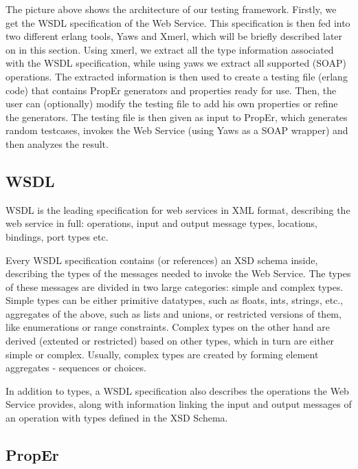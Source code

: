 \documentclass[submission,copyright,a4]{eptcs}
\begin{document}
The picture above shows the architecture of our testing framework. Firstly, we get the WSDL specification of the Web Service. This specification is then fed into two different erlang tools, Yaws and Xmerl, which will be briefly described later on in this section. Using xmerl, we extract all the type information associated with the WSDL specification, while using yaws we extract all supported (SOAP) operations. The extracted information is then used to create a testing file (erlang code) that contains PropEr generators and properties ready for use. Then, the user can (optionally) modify the testing file to add his own properties or refine the generators. The testing file is then given as input to PropEr, which generates random testcases, invokes the Web Service (using Yaws as a SOAP wrapper) and then analyzes the result.


\subsection{WSDL}

WSDL is the leading specification for web services in XML format, describing the web service in full: operations, input and output message types, locations, bindings, port types etc. 

Every WSDL specification contains (or references) an XSD schema inside, describing the types of the messages needed to invoke the Web Service. The types of these messages are divided in two large categories: simple and complex types. Simple types can be either primitive datatypes, such as floats, ints, strings, etc., aggregates of the above, such as lists and unions, or restricted versions of them, like enumerations or range constraints. Complex types on the other hand are derived (extented or restricted) based on other types, which in turn are either simple or complex. Usually, complex types are created by forming element aggregates - sequences or choices. 

In addition to types, a WSDL specification also describes the operations the Web Service provides, along with information linking the input and output messages of an operation with types defined in the XSD Schema. 

\subsection{PropEr}
\end{document}
